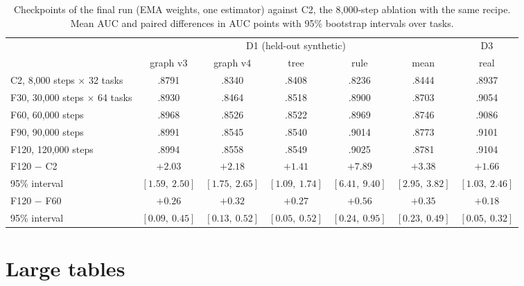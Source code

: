 \documentclass[11pt]{article}
\begin{document}
\begin{table}[t]
\centering
\small
\begin{tabular}{lcccccc}
\toprule
& \multicolumn{5}{c}{D1 (held-out synthetic)} & D3 \\
\cmidrule(lr){2-6}
& graph v3 & graph v4 & tree & rule & mean & real \\
\midrule
C2, 8,000 steps $\times$ 32 tasks & .8791 & .8340 & .8408 & .8236 & .8444 & .8937 \\
F30, 30,000 steps $\times$ 64 tasks & .8930 & .8464 & .8518 & .8900 & .8703 & .9054 \\
F60, 60,000 steps & .8968 & .8526 & .8522 & .8969 & .8746 & .9086 \\
F90, 90,000 steps & .8991 & .8545 & .8540 & .9014 & .8773 & .9101 \\
\rowcolor{orange!12}
F120, 120,000 steps & .8994 & .8558 & .8549 & .9025 & .8781 & .9104 \\
\midrule
F120 $-$ C2 & $+2.03$ & $+2.18$ & $+1.41$ & $+7.89$ & $+3.38$ & $+1.66$ \\
{\footnotesize 95\% interval} & {\footnotesize $[1.59,\ 2.50]$} & {\footnotesize $[1.75,\ 2.65]$}
  & {\footnotesize $[1.09,\ 1.74]$} & {\footnotesize $[6.41,\ 9.40]$} & {\footnotesize $[2.95,\ 3.82]$}
  & {\footnotesize $[1.03,\ 2.46]$} \\
F120 $-$ F60 & $+0.26$ & $+0.32$ & $+0.27$ & $+0.56$ & $+0.35$ & $+0.18$ \\
{\footnotesize 95\% interval} & {\footnotesize $[0.09,\ 0.45]$} & {\footnotesize $[0.13,\ 0.52]$}
  & {\footnotesize $[0.05,\ 0.52]$} & {\footnotesize $[0.24,\ 0.95]$} & {\footnotesize $[0.23,\ 0.49]$}
  & {\footnotesize $[0.05,\ 0.32]$} \\
\bottomrule
\end{tabular}
\caption{Checkpoints of the final run (EMA weights, one estimator) against C2, the 8,000-step ablation
with the same recipe. Mean AUC and paired differences in AUC points with 95\% bootstrap intervals over
tasks.}
\label{tab:final}
\end{table}

\section{Large tables}
\label{sec:large}
\end{document}
